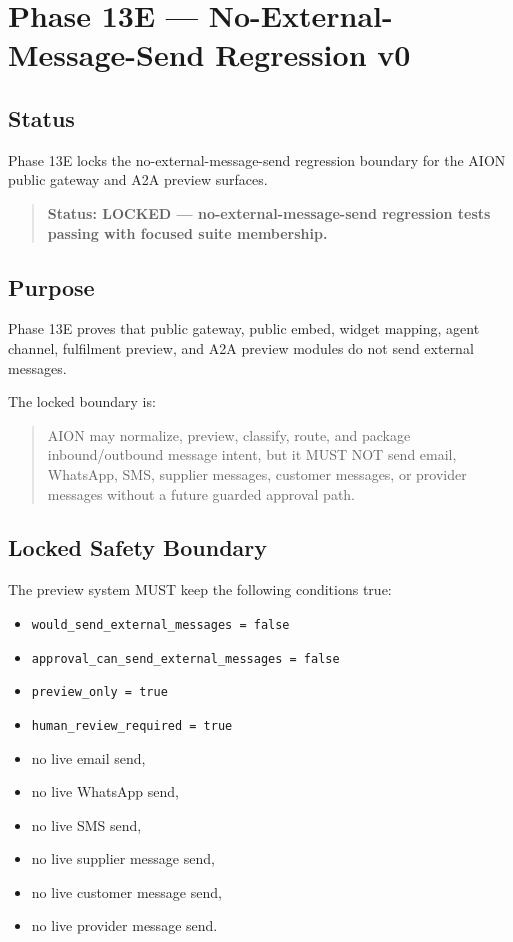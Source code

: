 \section{Phase 13E --- No-External-Message-Send Regression v0}
\label{sec:aion-phase13e-no-external-message-send-regression-v0}

\subsection{Status}

Phase 13E locks the no-external-message-send regression boundary for the AION
public gateway and A2A preview surfaces.

\begin{quote}
\textbf{Status: LOCKED --- no-external-message-send regression tests passing with focused suite membership.}
\end{quote}

\subsection{Purpose}

Phase 13E proves that public gateway, public embed, widget mapping, agent
channel, fulfilment preview, and A2A preview modules do not send external
messages.

The locked boundary is:

\begin{quote}
AION may normalize, preview, classify, route, and package inbound/outbound
message intent, but it MUST NOT send email, WhatsApp, SMS, supplier messages,
customer messages, or provider messages without a future guarded approval path.
\end{quote}

\subsection{Locked Safety Boundary}

The preview system MUST keep the following conditions true:

\begin{itemize}
  \item \texttt{would\_send\_external\_messages = false}
  \item \texttt{approval\_can\_send\_external\_messages = false}
  \item \texttt{preview\_only = true}
  \item \texttt{human\_review\_required = true}
  \item no live email send,
  \item no live WhatsApp send,
  \item no live SMS send,
  \item no live supplier message send,
  \item no live customer message send,
  \item no live provider message send.
\end{itemize}

